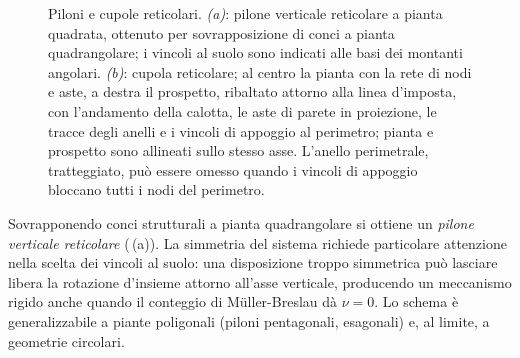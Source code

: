 \begin{figure}[htbp]
{}
	\caption{Piloni e cupole reticolari.
		\emph{(a)}: pilone verticale reticolare a pianta
		quadrata, ottenuto per sovrapposizione di conci
		a pianta quadrangolare; i vincoli al suolo sono
		indicati alle basi dei montanti angolari.
		\emph{(b)}: cupola reticolare; al centro la pianta
		con la rete di nodi e aste, a destra il prospetto,
		ribaltato attorno alla linea d'imposta, con
		l'andamento della calotta, le aste di parete in
		proiezione, le tracce degli anelli e i vincoli di
		appoggio al perimetro; pianta e prospetto sono
		allineati sullo stesso asse.
		L'anello perimetrale, tratteggiato, può essere
		omesso quando i vincoli di appoggio bloccano
		tutti i nodi del perimetro.}
	\label{fig:piloni_cupole}
\end{figure}


Sovrapponendo conci strutturali a pianta
quadrangolare si ottiene un \emph{pilone verticale
	reticolare} (\,(a)).
La simmetria del sistema richiede particolare
attenzione nella scelta dei vincoli al suolo:
una disposizione troppo simmetrica può lasciare
libera la rotazione d'insieme attorno all'asse
verticale, producendo un meccanismo rigido anche
quando il conteggio di M\"{u}ller-Breslau dà $\nu = 0$.
Lo schema è generalizzabile a piante poligonali
(piloni pentagonali, esagonali) e, al limite, a
geometrie circolari.

